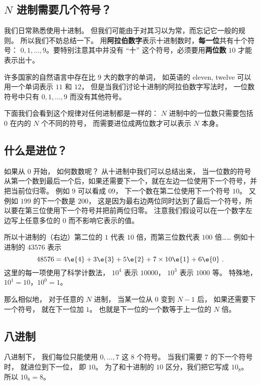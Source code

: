 
\begin{issues}
\issueDraft
\end{issues}

\subsection{$N$ 进制需要几个符号？}
我们日常熟悉使用十进制。 但我们可能由于对其习以为常，而忘记它一般的规则。 所以我们不妨总结一下。 用\textbf{阿拉伯数字}表示十进制数时，\textbf{每一位}共有十个符号： $0,1,\dots, 9$。要特别注意其中并没有 “十” 这个符号，必须要用\textbf{两位数} $10$ 才能表示出十。

许多国家的自然语言中存在比 $9$ 大的数字的单词， 如英语的 eleven, twelve 可以用一个单词表示 $11$ 和 $12$， 但是当我们讨论十进制的阿拉伯数字写法时， 一位数符号中只有 $0,1,\dots, 9$ 而没有其他符号。 

下面我们会看到这个规律对任何进制都是一样的： $N$ 进制中的一位数只需要包括 $0$ 在内的 $N$ 个不同的符号， 而需要进位成两位数才可以表示 $N$ 本身。

\subsection{什么是进位？}
如果从 $0$ 开始， 如何数数呢？ 从十进制中我们可以总结出来， 当一位数的符号从第一个数到最后一个后，如果还需要下一个，就在左边一位使用下一个符号，并把当前位归零。 例如 $9$ 可以看成 $09$， 下一个数在第二位使用下一个符号 $10$。 又例如 $199$ 的下一个数是 $200$， 这是因为最右边两位同时达到了最后一个符号，所以要在第三位使用下一个符号并把前两位归零。 注意我们假设可以在一个数字左边写上任意多位的 $0$ 而不影响它表示的值。

所以十进制的（右边）第二位的 $1$ 代表 $10$ 倍，而第三位数代表 $100$ 倍…… 例如十进制的 $43576$ 表示
\begin{equation}\label{eq_Binary_1}
48576 = 4\e{4} + 3\e{3} + 5\e{2} + 7\times 10\e{1} + 6\e{0}~.
\end{equation}
这里的每一项使用了科学计数法，%
$10^4$ 表示 $10000$， $10^3$ 表示 $1000$ 等。 特殊地， $10^1=10$，$10^0=1$。

那么相似地， 对于任意的 $N$ 进制， 当某一位从 $0$ 变到 $N-1$ 后， 如果还需要下一个符号， 就在下一位加 $1$。 也就是下一位的一个数等于上一位的 $N$ 倍。

\subsection{八进制}
八进制下， 我们每位只能使用 $0,\dots,7$ 这 $8$ 个符号。 当我们需要 $7$ 的下一个符号时， 就进位到下一位， 即 $10$。 为了和十进制的 $10$ 区分，我们把它写成 $10_\text{8}$。 所以 $10_\text{8} = 8$。

